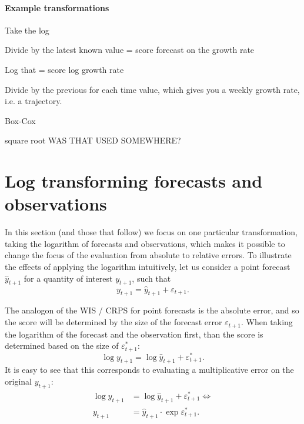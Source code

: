 \documentclass{article}
\begin{document}

\paragraph{Example transformations}

Take the log

Divide by the latest known value = score forecast on the growth rate

Log that = score log growth rate

Divide by the previous for each time value, which gives you a weekly growth rate, i.e. a trajectory. 

Box-Cox

square root WAS THAT USED SOMEWHERE? 

\section{Log transforming forecasts and observations}

In this section (and those that follow) we focus on one particular transformation, taking the logarithm of forecasts and observations, which makes it possible to change the focus of the evaluation from absolute to relative errors. To illustrate the effects of applying the logarithm intuitively, let us consider a point forecast $\hat{y}_{t+1}$ for a quantity of interest $y_{t+1}$, such that 
\begin{equation}
y_{t+1} = \hat{y}_{t+1} + \varepsilon_{t+1}.
\end{equation}

The analogon of the WIS / CRPS for point forecasts is the absolute error, and so the score will be determined by the size of the forecast error $\varepsilon_{t+1}$. When taking the logarithm of the forecast and the observation first, than the score is determined based on the size of $\varepsilon^*_{t+1}$: 
\begin{equation}
\log y_{t+1} = \log \hat{y}_{t+1} + \varepsilon^*_{t+1}.
\end{equation}
%
It is easy to see that this corresponds to evaluating a multiplicative error on the original $y_{t+1}$:
%
\begin{align}
\log y_{t+1} &= \log \hat{y}_{t+1} + \varepsilon^*_{t+1} \Leftrightarrow \\    
y_{t+1} &= \hat{y}_{t+1} \cdot \exp{\varepsilon^*_{t+1}}.    
\end{align}
%
\end{document}
